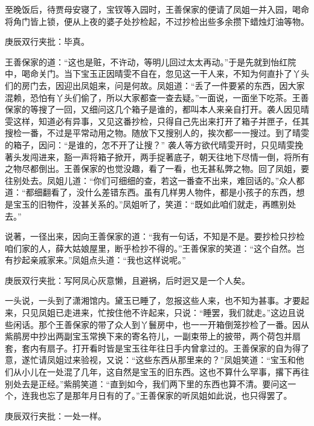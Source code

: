 \begin{parag}
    至晚饭后，待贾母安寝了，宝钗等入园时，王善保家的便请了凤姐一并入园，喝命将角门皆上锁，便从上夜的婆子处抄检起，不过抄检出些多余攒下蜡烛灯油等物。\begin{note}庚辰双行夹批：毕真。\end{note}王善保家的道：“这也是赃，不许动，等明儿回过太太再动。”于是先就到怡红院中，喝命关门。当下宝玉正因晴雯不自在，忽见这一干人来，不知为何直扑了丫头们的房门去，因迎出凤姐来，问是何故。凤姐道：“丢了一件要紧的东西，因大家混赖，恐怕有丫头们偷了，所以大家都查一查去疑。”一面说，一面坐下吃茶。王善保家的等搜了一回，又细问这几个箱子是谁的，都叫本人来亲自打开。袭人因见晴雯这样，知道必有异事，又见这番抄检，只得自己先出来打开了箱子并匣子，任其搜检一番，不过是平常动用之物。随放下又搜别人的，挨次都一一搜过。到了晴雯的箱子，因问：“是谁的，怎不开了让搜？” 袭人等方欲代晴雯开时，只见晴雯挽著头发闯进来，豁一声将箱子掀开，两手捉著底子，朝天往地下尽情一倒，将所有之物尽都倒出。王善保家的也觉没趣，看了一看，也无甚私弊之物。回了凤姐，要往别处去。凤姐儿道：“你们可细细的查，若这一番查不出来，难回话的。”众人都道：“都细翻看了，没什么差错东西。虽有几样男人物件，都是小孩子的东西，想是宝玉的旧物件，没甚关系的。”凤姐听了，笑道：“既如此咱们就走，再瞧别处去。”
\end{parag}


\begin{parag}
    说著，一径出来，因向王善保家的道：“我有一句话，不知是不是。要抄检只抄检咱们家的人，薛大姑娘屋里，断乎检抄不得的。”王善保家的笑道：“这个自然。岂有抄起亲戚家来。”凤姐点头道：“我也这样说呢。”\begin{note}庚辰双行夹批：写阿凤心灰意懒，且避祸，后时迥又是一个人矣。\end{note}一头说，一头到了潇湘馆内。黛玉已睡了，忽报这些人来，也不知为甚事。才要起来，只见凤姐已走进来，忙按住他不许起来，只说：“睡罢，我们就走。”这边且说些闲话。那个王善保家的带了众人到丫鬟房中，也一一开箱倒笼抄检了一番。因从紫鹃房中抄出两副宝玉常换下来的寄名符儿，一副束带上的披带，两个荷包并扇套，套内有扇子。打开看时皆是宝玉往年往日手内曾拿过的。王善保家的自为得了意，遂忙请凤姐过来验视，又说：“这些东西从那里来的？”凤姐笑道：“宝玉和他们从小儿在一处混了几年，这自然是宝玉的旧东西。这也不算什么罕事，撂下再往别处去是正经。”紫鹃笑道：“直到如今，我们两下里的东西也算不清。要问这一个，连我也忘了是那年月日有的了。”王善保家的听凤姐如此说，也只得罢了。\begin{note}庚辰双行夹批：一处一样。\end{note}
\end{parag}


